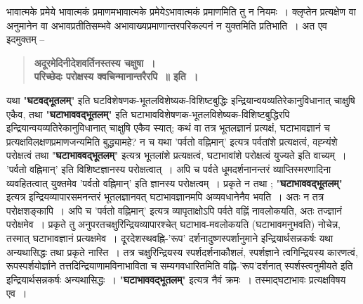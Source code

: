 {भावात्मके प्रमेये भावात्मकं प्रमाणमभावात्मके प्रमेयेऽभावात्मकं प्रमाणमिति तु न नियमः~। क्लृप्तेन प्रत्यक्षेण वा अनुमानेन वा अभावप्रतीतिसम्भवे अभावाख्यप्रमाणान्तरपरिकल्पनं न युक्तमिति प्रतिभाति~। अत एव इदमुक्तम् –
\begin{verse}
\textbf{अदूरमेदिनीदेशवर्तिनस्तस्य चक्षुषा~। \\
परिच्छेदः परोक्षस्य क्वचिन्मानान्तरैरपि~॥ इति~। }
\end{verse}
यथा "\textbf{घटवद्भूतलम्}" इति घटविशेषणक-भूतलविशेष्यक-विशिष्टबुद्धिः इन्द्रियान्वयव्यतिरेकानुविधानात् चाक्षुषि एकैव, तथा "\textbf{घटाभाववद्भूतलम्}" इति घटाभावविशेषणक-भूतल\-विशेष्यक-विशिष्टबुद्धिरपि इन्द्रियान्वयव्यतिरेकानुविधानात् चाक्षुषि एकैव स्यात्; कथं वा तत्र भूतलज्ञानं प्रत्यक्षं, घटाभावज्ञानं च प्रत्यक्षविलक्षणप्रमाणजन्यमिति बुद्ध्यामहे? न च यथा 'पर्वतो वह्निमान्' इत्यत्र पर्वतांशे प्रत्यक्षत्वं, वह्न्यंशे परोक्षत्वं तथा "\textbf{घटाभाववद्भूतलम्}" इत्यत्र भूतलांशे प्रत्यक्षत्वं, घटाभावांशे परोक्षत्वं युज्यते इति वाच्यम्~। 'पर्वतो वह्निमान्' इति विशिष्टज्ञानस्य परोक्षत्वात्~। अपि च पर्वते धूमदर्शनानन्तरं व्याप्तिस्मरणादिना व्यवहितत्वात् युक्तमेव 'पर्वतो वह्निमान्' इति ज्ञानस्य परोक्षत्वम्~। प्रकृते न तथा ; "\textbf{घटाभाववद्भूतलम्}" इत्यत्र इन्द्रियव्यापारसमनन्तरं भूतलज्ञानवत् घटाभावज्ञानमपि अव्यवधानेनैव भवति~। अतः न तत्र परोक्षशङ्कापि~। अपि च 'पर्वतो वह्निमान्' इत्यत्र व्यापृताक्षोऽपि पर्वते वह्निं नावलोकयति, अतः तज्ज्ञानं परोक्षमेव~। प्रकृते तु अनुपरतचक्षुरिन्द्रियव्यापारश्चेत् घटाभाव-मवलोकयति (घटाभावमनुभवति) नोचेन्न, तस्मात् घटाभावज्ञानं प्रत्यक्षमेव~। दूरदेशस्थवह्नि-'रूप' दर्शनादुष्णस्पर्शानुमाने इन्द्रियार्थसन्नकर्षः यथा अन्यथासिद्धः तथा प्रकृते नास्ति~। तत्र चक्षुरिन्द्रियस्य स्पर्शदर्शनाकौशलं, स्पर्शज्ञाने त्वगिन्द्रियस्य कारणत्वं, रूपस्पर्शयोर्ज्ञाने तत्तदिन्द्रियाणामविनाभाविता च सम्यगवधारितमिति वह्नि-'रूप'दर्शनात् स्पर्शस्त्वनुमीयते इति इन्द्रियार्थसन्नकर्षः अन्यथासिद्धः~। "\textbf{घटाभाववद्भूतलम्}" इत्यत्र नैवं क्रमः~। तस्माद्घटाभावः प्रत्यक्षविषय एव~। 

}
